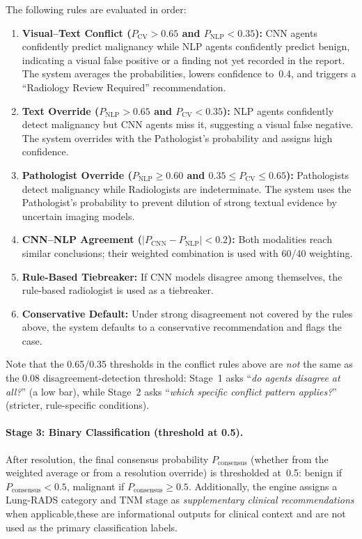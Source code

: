 \documentclass[12pt]{article}
\begin{document}
The following rules are evaluated in order:
\begin{enumerate}
    \item \textbf{Visual--Text Conflict ($P_\text{CV} > 0.65$ and $P_\text{NLP} < 0.35$):} CNN agents confidently predict malignancy while NLP agents confidently predict benign, indicating a visual false positive or a finding not yet recorded in the report. The system averages the probabilities, lowers confidence to~0.4, and triggers a ``Radiology Review Required'' recommendation.
    \item \textbf{Text Override ($P_\text{NLP} > 0.65$ and $P_\text{CV} < 0.35$):} NLP agents confidently detect malignancy but CNN agents miss it, suggesting a visual false negative. The system overrides with the Pathologist's probability and assigns high confidence.
    \item \textbf{Pathologist Override ($P_\text{NLP} \ge 0.60$ and $0.35 \le P_\text{CV} \le 0.65$):} Pathologists detect malignancy while Radiologists are indeterminate. The system uses the Pathologist's probability to prevent dilution of strong textual evidence by uncertain imaging models.
    \item \textbf{CNN--NLP Agreement ($|P_\text{CNN} - P_\text{NLP}| < 0.2$):} Both modalities reach similar conclusions; their weighted combination is used with 60/40 weighting.
    \item \textbf{Rule-Based Tiebreaker:} If CNN models disagree among themselves, the rule-based radiologist is used as a tiebreaker.
    \item \textbf{Conservative Default:} Under strong disagreement not covered by the rules above, the system defaults to a conservative recommendation and flags the case.
\end{enumerate}

Note that the 0.65/0.35 thresholds in the conflict rules above are \emph{not} the same as the 0.08 disagreement-detection threshold: Stage~1 asks ``\emph{do agents disagree at all?}'' (a low bar), while Stage~2 asks ``\emph{which specific conflict pattern applies?}'' (stricter, rule-specific conditions).

\paragraph{Stage 3: Binary Classification (threshold at 0.5).}
After resolution, the final consensus probability $P_\text{consensus}$ (whether from the weighted average or from a resolution override) is thresholded at~0.5: benign if $P_\text{consensus} < 0.5$, malignant if $P_\text{consensus} \ge 0.5$. Additionally, the engine assigns a Lung-RADS category and TNM stage as \emph{supplementary clinical recommendations} when applicable,these are informational outputs for clinical context and are not used as the primary classification labels.
\end{document}
